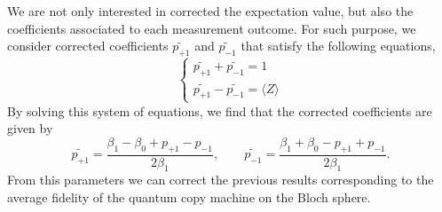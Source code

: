\documentclass[11pt]{article}
\begin{document}
We are not only interested in corrected the expectation value, but also the coefficients associated to each measurement outcome. For such purpose, we consider corrected coefficients $\tilde{p_{+1}}$ and $\tilde{p_{-1}}$ that satisfy the following equations,
\begin{equation}
\left\{ \begin{array}{c}
\tilde{p_{+1}} + \tilde{p_{-1}} = 1\\
\tilde{p_{+1}} - \tilde{p_{-1}} = \langle Z\rangle 
\end{array} \right.
\end{equation}
By solving this system of equations, we find that the corrected coefficients are given by
\begin{equation}
\tilde{p_{+1}} = \frac{\beta_1-\beta_0+p_{+1}-p_{-1}}{2\beta_1},\qquad \tilde{p_{-1}} = \frac{\beta_1+\beta_0-p_{+1}+p_{-1}}{2\beta_1}.
\end{equation} 
From this parameters we can correct the previous results corresponding to the average fidelity of the quantum copy machine on the Bloch sphere. 
\end{document}
